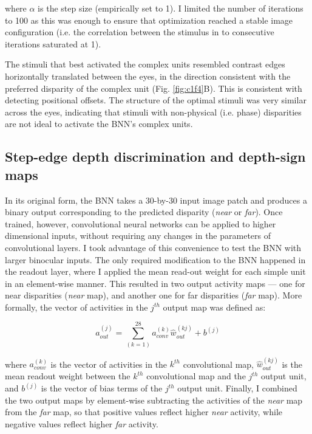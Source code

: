 where $\alpha$ is the step size (empirically set to 1). I limited the number of iterations to 100 as this was enough to ensure that optimization reached a stable image configuration (i.e. the correlation between the stimulus in to consecutive iterations saturated at 1).

The stimuli that best activated the complex units resembled contrast edges horizontally translated between the eyes, in the direction consistent with the preferred disparity of the complex unit (Fig. \ref{fig:c1f4}B). This is consistent with detecting positional offsets. The structure of the optimal stimuli was very similar across the eyes, indicating that stimuli with non-physical (i.e. phase) disparities are not ideal to activate the BNN's complex units. 


\subsection*{Step-edge depth discrimination and depth-sign maps}

In its original form, the BNN takes a 30-by-30 input image patch and produces a binary output corresponding to the predicted disparity ({\it near} or {\it far}). Once trained, however, convolutional neural networks can be applied to higher dimensional inputs, without requiring any changes in the parameters of convolutional layers. I took advantage of this convenience to test the BNN with larger binocular inputs. The only required modification to the BNN happened in the readout layer, where I applied the mean read-out weight for each simple unit in an element-wise manner. This resulted in two output activity maps --- one for near disparities ({\it near} map), and another one for far disparities ({\it far} map). More formally, the vector of activities in the $j^{th}$ output map was defined as:

\begin{equation}
  a_{out}^{(j)}= \sum_{(k=1)}^{28} a_{conv}^{(k)} \hat{w}_{out}^{(kj)} + b^{(j)}
\end{equation}

where $a_{conv}^{(k)}$ is the vector of activities in the $k^{th}$ convolutional map, $\hat{w}_{out}^{(kj)}$ is the mean readout weight between the $k^{th}$ convolutional map and the $j^{th}$ output unit, and $b^{(j)}$ is the vector of bias terms of the $j^{th}$ output unit. Finally, I combined the two output maps by element-wise subtracting the activities of the {\it near} map from the {\it far} map, so that positive values reflect higher {\it near} activity, while negative values reflect higher {\it far} activity.


